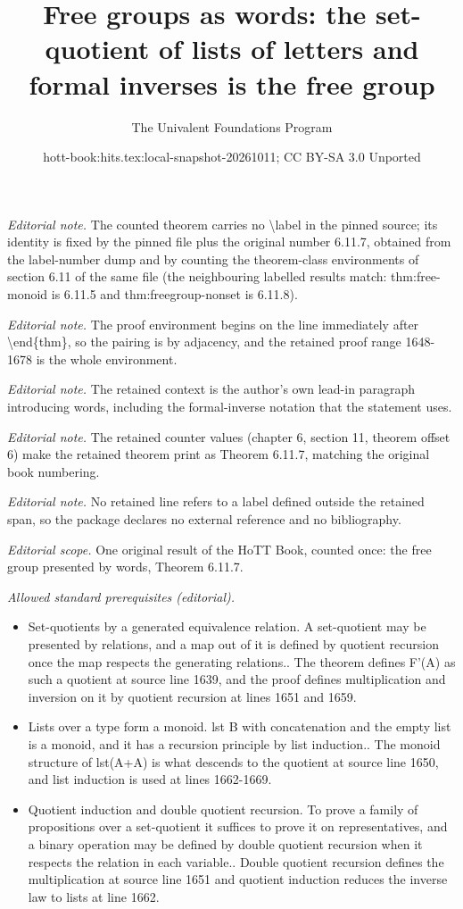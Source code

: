 \documentclass[10pt,a4paper]{article}
\title{Free groups as words: the set-quotient of lists of letters and formal inverses is the free group}
\author{The Univalent Foundations Program}
\date{hott-book:hits.tex:local-snapshot-20261011; CC BY-SA 3.0 Unported}
\newcounter{chapter}
\theoremstyle{definition}
\theoremstyle{remark}
\numberwithin{equation}{section}
\begin{document}
\maketitle
\setcounter{chapter}{6}
\setcounter{section}{11}
\setcounter{thm}{6}
\noindent\textit{Editorial note.} The counted theorem carries no \textbackslash{}label in the pinned source; its identity is fixed by the pinned file plus the original number 6.11.7, obtained from the label-number dump and by counting the theorem-class environments of section 6.11 of the same file (the neighbouring labelled results match: thm:free-monoid is 6.11.5 and thm:freegroup-nonset is 6.11.8).\par\medskip
\noindent\textit{Editorial note.} The proof environment begins on the line immediately after \textbackslash{}end\{thm\}, so the pairing is by adjacency, and the retained proof range 1648-1678 is the whole environment.\par\medskip
\noindent\textit{Editorial note.} The retained context is the author's own lead-in paragraph introducing words, including the formal-inverse notation that the statement uses.\par\medskip
\noindent\textit{Editorial note.} The retained counter values (chapter 6, section 11, theorem offset 6) make the retained theorem print as Theorem 6.11.7, matching the original book numbering.\par\medskip
\noindent\textit{Editorial note.} No retained line refers to a label defined outside the retained span, so the package declares no external reference and no bibliography.\par\medskip
\noindent\textit{Editorial scope.} One original result of the HoTT Book, counted once: the free group presented by words, Theorem 6.11.7.\par\medskip
\noindent\textit{Allowed standard prerequisites (editorial).}\begin{itemize}
\item Set-quotients by a generated equivalence relation. A set-quotient may be presented by relations, and a map out of it is defined by quotient recursion once the map respects the generating relations.. The theorem defines F'(A) as such a quotient at source line 1639, and the proof defines multiplication and inversion on it by quotient recursion at lines 1651 and 1659.
\item Lists over a type form a monoid. lst B with concatenation and the empty list is a monoid, and it has a recursion principle by list induction.. The monoid structure of lst(A+A) is what descends to the quotient at source line 1650, and list induction is used at lines 1662-1669.
\item Quotient induction and double quotient recursion. To prove a family of propositions over a set-quotient it suffices to prove it on representatives, and a binary operation may be defined by double quotient recursion when it respects the relation in each variable.. Double quotient recursion defines the multiplication at source line 1651 and quotient induction reduces the inverse law to lists at line 1662.
\end{itemize}\medskip
\end{document}
